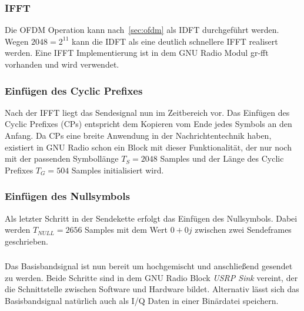 \subsubsection{\ac{IFFT}}
Die OFDM Operation kann nach~\ref{sec:ofdm} als \ac{IDFT} durchgeführt werden. Wegen $2048 = 2^{11}$ kann die IDFT als eine deutlich schnellere IFFT realisert werden. Eine IFFT Implementierung ist in dem GNU Radio Modul \glqq gr-fft\grqq{} vorhanden \cite{repo:gr-fft} und wird verwendet.

\subsubsection{Einfügen des Cyclic Prefixes}
Nach der IFFT liegt das Sendesignal nun im Zeitbereich vor. Das Einfügen des Cyclic Prefixes (CPs) entspricht dem Kopieren vom Ende jedes Symbols an den Anfang. Da CPs eine breite Anwendung in der Nachrichtentechnik haben, existiert in GNU Radio schon ein Block mit dieser Funktionalität, der nur noch mit der passenden Symbollänge $T_S = 2048$ Samples und der Länge des Cyclic Prefixes $T_G = 504$ Samples initialisiert wird.

\subsubsection{Einfügen des Nullsymbols}
Als letzter Schritt in der Sendekette erfolgt das Einfügen des Nullsymbols. Dabei werden $T_{NULL}=2656$ Samples mit dem Wert $0+0j$ zwischen zwei Sendeframes geschrieben.

\subsubsection{}
Das Basisbandsignal ist nun bereit um hochgemischt und anschließend gesendet zu werden. Beide Schritte sind in dem GNU Radio Block \textit{USRP Sink} vereint, der die Schnittstelle zwischen Software und Hardware bildet. Alternativ lässt sich das Basisbandsignal natürlich auch als I/Q Daten in einer Binärdatei speichern.